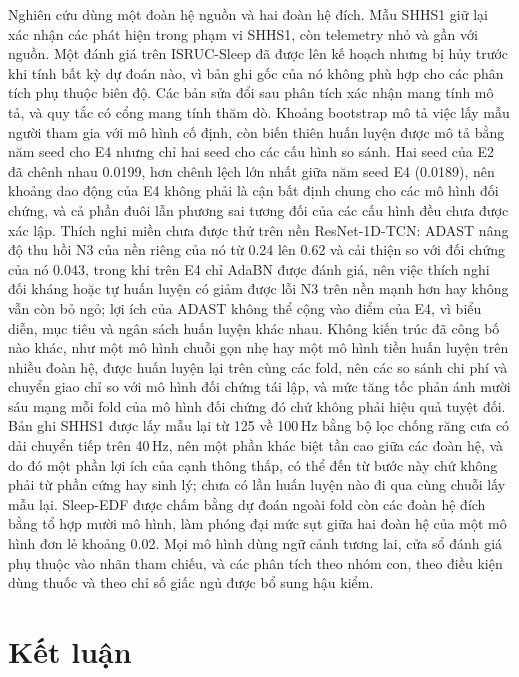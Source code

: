 \documentclass[11pt,a4paper]{article}
\begin{document}
Nghiên cứu dùng một đoàn hệ nguồn và hai đoàn hệ đích. Mẫu SHHS1 giữ lại xác nhận các phát hiện trong phạm vi
SHHS1, còn telemetry nhỏ và gần với nguồn. Một đánh giá trên ISRUC-Sleep đã được lên kế hoạch nhưng bị hủy trước
khi tính bất kỳ dự đoán nào, vì bản ghi gốc của nó không phù hợp cho các phân tích phụ thuộc biên độ. Các bản sửa
đổi sau phân tích xác nhận mang tính mô tả, và quy tắc có cổng mang tính thăm dò. Khoảng bootstrap mô tả việc
lấy mẫu người tham gia với mô hình cố định, còn biến thiên huấn luyện được mô tả bằng năm seed cho E4 nhưng chỉ hai
seed cho các cấu hình so sánh. Hai seed của E2 đã chênh nhau 0.0199, hơn chênh lệch lớn nhất giữa năm seed E4
(0.0189), nên khoảng dao động của E4 không phải là cận bất định chung cho các mô hình đối chứng, và cả phần đuôi lẫn
phương sai tương đối của các cấu hình đều chưa được xác lập. Thích nghi miền chưa được thử trên nền ResNet-1D-TCN:
ADAST nâng độ thu hồi N3 của nền riêng của nó từ 0.24 lên 0.62 và cải thiện so với đối chứng của nó 0.043, trong khi
trên E4 chỉ AdaBN được đánh giá, nên việc thích nghi đối kháng hoặc tự huấn luyện có giảm được lỗi N3 trên nền mạnh
hơn hay không vẫn còn bỏ ngỏ; lợi ích của ADAST không thể cộng vào điểm của E4, vì biểu diễn, mục tiêu và ngân sách
huấn luyện khác nhau. Không kiến trúc đã công bố nào khác, như một mô hình chuỗi gọn nhẹ hay một mô hình tiền huấn
luyện trên nhiều đoàn hệ, được huấn luyện lại trên cùng các fold, nên các so sánh chi phí và chuyển giao chỉ so với
mô hình đối chứng tái lập, và mức tăng tốc phản ánh mười sáu mạng mỗi fold của mô hình đối chứng đó chứ không phải
hiệu quả tuyệt đối. Bản ghi SHHS1 được lấy mẫu lại từ 125 về 100\,Hz bằng bộ lọc chống răng cưa có dải chuyển tiếp
trên 40\,Hz, nên một phần khác biệt tần cao giữa các đoàn hệ, và do đó một phần lợi ích của cạnh thông thấp, có thể
đến từ bước này chứ không phải từ phần cứng hay sinh lý; chưa có lần huấn luyện nào đi qua cùng chuỗi lấy mẫu lại.
Sleep-EDF được chấm bằng dự đoán ngoài fold còn các đoàn hệ đích bằng tổ hợp mười mô hình, làm phóng đại mức sụt
giữa hai đoàn hệ của một mô hình đơn lẻ khoảng 0.02. Mọi mô hình dùng ngữ cảnh tương lai, cửa sổ đánh giá phụ thuộc
vào nhãn tham chiếu, và các phân tích theo nhóm con, theo điều kiện dùng thuốc và theo chỉ số giấc ngủ được bổ sung
hậu kiểm.

\section{Kết luận}
\end{document}
